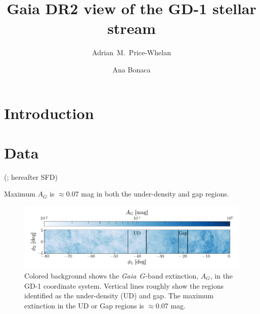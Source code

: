 \documentclass[modern]{aastex62}
\newcommand{\gaia}{\textsl{Gaia}}
\begin{document}
\sloppy\sloppypar\raggedbottom\frenchspacing %

\title{Gaia DR2 view of the GD-1 stellar stream}

\author[0000-0003-0872-7098]{Adrian~M.~Price-Whelan}

\author[0000-0002-7846-9787]{Ana Bonaca}


\begin{abstract}\noindent %

\end{abstract}


\section{Introduction}
\label{sec:intro}


\section{Data}
\label{sec:data}

(\citealt{Schlegel:1998, Schlafly:2011}; hereafter SFD)

Maximum $A_G$ is $\approx$0.07 mag in both the under-density and gap regions.

\begin{figure}[h]
\begin{center}
\includegraphics[width=\textwidth]{sfd.pdf}
\end{center}
\caption{%
Colored background shows the \gaia\ $G$-band extinction, $A_G$, in the GD-1
coordinate system.
Vertical lines roughly show the regions identified as the under-density (UD) and
gap.
The maximum extinction in the UD or Gap regions is $\approx$0.07 mag.
\label{fig:sfd}
}
\end{figure}
\end{document}
